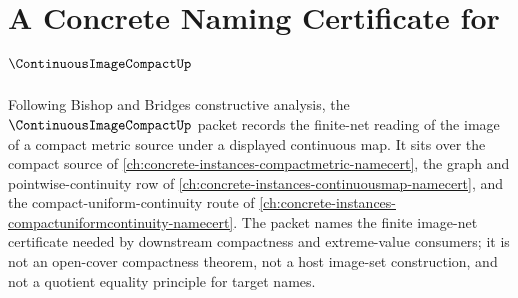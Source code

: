 \chapter{A Concrete Naming Certificate for $\ContinuousImageCompactUp$}
\label{ch:concrete-instances-continuous-image-compact-namecert}

Following Bishop and Bridges constructive analysis, the $\ContinuousImageCompactUp$ packet records the finite-net reading of the image of a compact metric source under a displayed continuous map. It sits over the compact source of \autoref{ch:concrete-instances-compactmetric-namecert}, the graph and pointwise-continuity row of \autoref{ch:concrete-instances-continuousmap-namecert}, and the compact-uniform-continuity route of \autoref{ch:concrete-instances-compactuniformcontinuity-namecert}. The packet names the finite image-net certificate needed by downstream compactness and extreme-value consumers; it is not an open-cover compactness theorem, not a host image-set construction, and not a quotient equality principle for target names.

